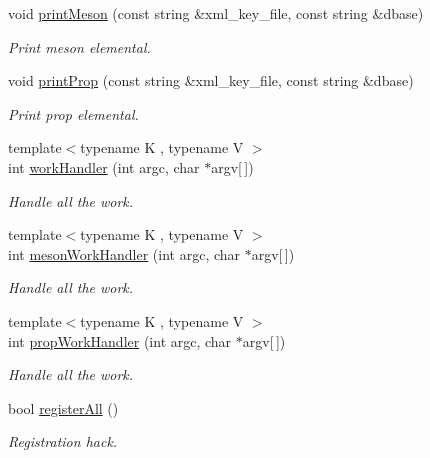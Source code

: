 \begin{DoxyCompactItemize}
void \mbox{\hyperlink{namespaceedb__reader_a15f77d6bf819d626b19549dbd921c1b0}{print\+Meson}} (const string \&xml\+\_\+key\+\_\+file, const string \&dbase)
\begin{DoxyCompactList}\small\item\em Print meson elemental. \end{DoxyCompactList}\item 
void \mbox{\hyperlink{namespaceedb__reader_a35b2acb7ef05b07177eb13058c1f4768}{print\+Prop}} (const string \&xml\+\_\+key\+\_\+file, const string \&dbase)
\begin{DoxyCompactList}\small\item\em Print prop elemental. \end{DoxyCompactList}\item 
{\footnotesize template$<$typename K , typename V $>$ }\\int \mbox{\hyperlink{namespaceedb__reader_a25cd3a48db32e167495d3229528e6cdb}{work\+Handler}} (int argc, char $\ast$argv\mbox{[}$\,$\mbox{]})
\begin{DoxyCompactList}\small\item\em Handle all the work. \end{DoxyCompactList}\item 
{\footnotesize template$<$typename K , typename V $>$ }\\int \mbox{\hyperlink{namespaceedb__reader_acbef2e39b69c0ac895a7f37a12f9ed47}{meson\+Work\+Handler}} (int argc, char $\ast$argv\mbox{[}$\,$\mbox{]})
\begin{DoxyCompactList}\small\item\em Handle all the work. \end{DoxyCompactList}\item 
{\footnotesize template$<$typename K , typename V $>$ }\\int \mbox{\hyperlink{namespaceedb__reader_a2d373bb444230e1ed02c918c196f1d39}{prop\+Work\+Handler}} (int argc, char $\ast$argv\mbox{[}$\,$\mbox{]})
\begin{DoxyCompactList}\small\item\em Handle all the work. \end{DoxyCompactList}\item 
bool \mbox{\hyperlink{namespaceedb__reader_abc5253cfecd30dd91009a5b4d96a3306}{register\+All}} ()
\begin{DoxyCompactList}\small\item\em Registration hack. \end{DoxyCompactList}\item 

\end{DoxyCompactItemize}
